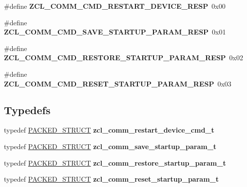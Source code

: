 \begin{DoxyCompactItemize}
\mbox{\label{group__zcl__commissioning_gaaa66ad63e343d1e240de1c7ddb756252}} 
\#define {\bfseries Z\+C\+L\+\_\+\+C\+O\+M\+M\+\_\+\+C\+M\+D\+\_\+\+R\+E\+S\+T\+A\+R\+T\+\_\+\+D\+E\+V\+I\+C\+E\+\_\+\+R\+E\+SP}~0x00
\item 
\mbox{\label{group__zcl__commissioning_ga8fe85768360779f35242575201dee3a1}} 
\#define {\bfseries Z\+C\+L\+\_\+\+C\+O\+M\+M\+\_\+\+C\+M\+D\+\_\+\+S\+A\+V\+E\+\_\+\+S\+T\+A\+R\+T\+U\+P\+\_\+\+P\+A\+R\+A\+M\+\_\+\+R\+E\+SP}~0x01
\item 
\mbox{\label{group__zcl__commissioning_gab63c0df9d3243bd75d1672e635de781e}} 
\#define {\bfseries Z\+C\+L\+\_\+\+C\+O\+M\+M\+\_\+\+C\+M\+D\+\_\+\+R\+E\+S\+T\+O\+R\+E\+\_\+\+S\+T\+A\+R\+T\+U\+P\+\_\+\+P\+A\+R\+A\+M\+\_\+\+R\+E\+SP}~0x02
\item 
\mbox{\label{group__zcl__commissioning_gaf1e51dad8a536ed567cf7e15bd30d6c9}} 
\#define {\bfseries Z\+C\+L\+\_\+\+C\+O\+M\+M\+\_\+\+C\+M\+D\+\_\+\+R\+E\+S\+E\+T\+\_\+\+S\+T\+A\+R\+T\+U\+P\+\_\+\+P\+A\+R\+A\+M\+\_\+\+R\+E\+SP}~0x03
\end{DoxyCompactItemize}
\subsection*{Typedefs}
\begin{DoxyCompactItemize}
\item 
typedef \hyperlink{group___s_x_a_ga4233297bd31be5c273d4fb0758cc54d7}{P\+A\+C\+K\+E\+D\+\_\+\+S\+T\+R\+U\+CT} {\bfseries zcl\+\_\+comm\+\_\+restart\+\_\+device\+\_\+cmd\+\_\+t}
\item 
typedef \hyperlink{group___s_x_a_ga4233297bd31be5c273d4fb0758cc54d7}{P\+A\+C\+K\+E\+D\+\_\+\+S\+T\+R\+U\+CT} {\bfseries zcl\+\_\+comm\+\_\+save\+\_\+startup\+\_\+param\+\_\+t}
\item 
typedef \hyperlink{group___s_x_a_ga4233297bd31be5c273d4fb0758cc54d7}{P\+A\+C\+K\+E\+D\+\_\+\+S\+T\+R\+U\+CT} {\bfseries zcl\+\_\+comm\+\_\+restore\+\_\+startup\+\_\+param\+\_\+t}
\item 
typedef \hyperlink{group___s_x_a_ga4233297bd31be5c273d4fb0758cc54d7}{P\+A\+C\+K\+E\+D\+\_\+\+S\+T\+R\+U\+CT} {\bfseries zcl\+\_\+comm\+\_\+reset\+\_\+startup\+\_\+param\+\_\+t}
\end{DoxyCompactItemize}
